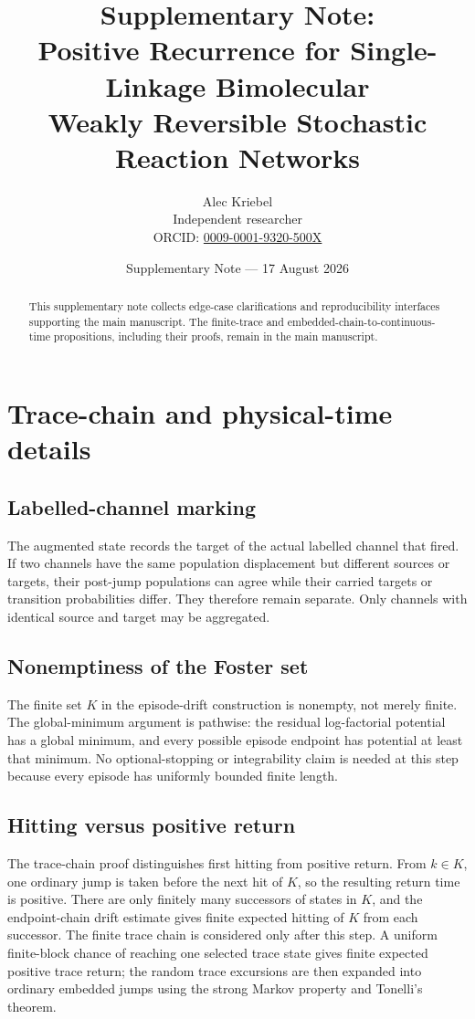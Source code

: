 \documentclass[10pt]{article}
\title{\bfseries Supplementary Note:\\[0.25em]
Positive Recurrence for Single-Linkage Bimolecular\\
Weakly Reversible Stochastic Reaction Networks}
\author{Alec Kriebel\\[0.2em]
\small Independent researcher\\
\small ORCID: \href{https://orcid.org/0009-0001-9320-500X}{0009-0001-9320-500X}}
\date{Supplementary Note --- 17 August 2026}
\begin{document}
\maketitle

\begin{abstract}
This supplementary note collects edge-case clarifications and reproducibility
interfaces supporting the main manuscript.  The finite-trace and
embedded-chain-to-continuous-time propositions, including their proofs, remain
in the main manuscript.
\end{abstract}

\section{Trace-chain and physical-time details}

\subsection{Labelled-channel marking}

The augmented state records the target of the actual labelled channel that
fired.  If two channels have the same population displacement but different
sources or targets, their post-jump populations can agree while their carried
targets or transition probabilities differ.  They therefore remain separate.
Only channels with identical source and target may be aggregated.

\subsection{Nonemptiness of the Foster set}

The finite set $K$ in the episode-drift construction is nonempty, not merely
finite.  The global-minimum argument is pathwise: the residual log-factorial
potential has a global minimum, and every possible episode endpoint has
potential at least that minimum.  No optional-stopping or integrability claim
is needed at this step because every episode has uniformly bounded finite
length.

\subsection{Hitting versus positive return}

The trace-chain proof distinguishes first hitting from positive return.  From
$k\in K$, one ordinary jump is taken before the next hit of $K$, so the
resulting return time is positive.  There are only finitely many successors of
states in $K$, and the endpoint-chain drift estimate gives finite expected
hitting of $K$ from each successor.  The finite trace chain is considered only
after this step.  A uniform finite-block chance of reaching one selected trace
state gives finite expected positive trace return; the random trace excursions
are then expanded into ordinary embedded jumps using the strong Markov
property and Tonelli's theorem.
\end{document}
